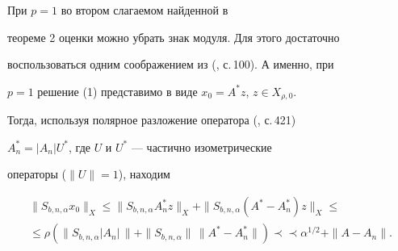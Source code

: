 




\begin{notenonum} При $p=1$ во втором слагаемом найденной в


теореме 2 оценки можно убрать знак модуля. Для этого достаточно


воспользоваться одним соображением из (\cite{VV}, с.\,100). А именно, при


$p=1$  решение  (1) представимо в виде $x_0=A^*z$, $z\in X_{\rho,0}$.


Тогда, используя полярное  разложение оператора (\cite{K}, с.\,421)


$A_n^*=|A_n|U^*$, где $U$ и $U^*$ --- частично изометрические


операторы ($\|U\|=1$), находим


\begin{multline*}


\|S_{b,n,\alpha}x_0\|_X \le \|S_{b,n,\alpha}A_n^*z\|_X +


\|S_{b,n,\alpha}(A^*-A_n^*)z\|_X \le \\


\le \rho\left(\|S_{b,n,\alpha}|A_n|\,\| +


\|S_{b,n,\alpha}\|\,\|A^*-A_n^*\|\right) \prec\prec 


\alpha^{1/2} + \|A-A_n\|.


\end{multline*}


\end{notenonum}






